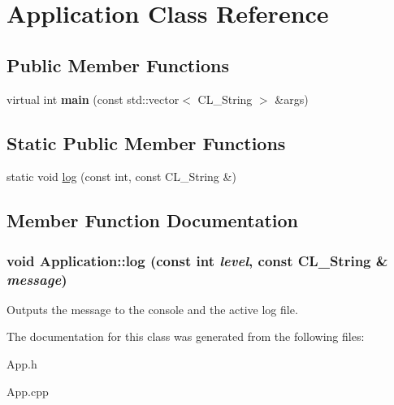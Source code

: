 \hypertarget{classApplication}{
\section{Application Class Reference}
\label{classApplication}
}
\subsection*{Public Member Functions}
\begin{DoxyCompactItemize}
\item 
\hypertarget{classApplication_abbda0eddef2dd5fcce957a82373ecb6c}{
virtual int {\bfseries main} (const std::vector$<$ CL\_\-String $>$ \&args)}
\label{classApplication_abbda0eddef2dd5fcce957a82373ecb6c}

\end{DoxyCompactItemize}
\subsection*{Static Public Member Functions}
\begin{DoxyCompactItemize}
\item 
static void \hyperlink{classApplication_a1112e5aede67cff7aad4c8fb4be3e3af}{log} (const int, const CL\_\-String \&)
\end{DoxyCompactItemize}


\subsection{Member Function Documentation}
\hypertarget{classApplication_a1112e5aede67cff7aad4c8fb4be3e3af}{
\subsubsection[{log}]{\setlength{\rightskip}{0pt plus 5cm}void Application::log (const int {\em level}, \/  const CL\_\-String \& {\em message})}}
\label{classApplication_a1112e5aede67cff7aad4c8fb4be3e3af}
Outputs the message to the console and the active log file. 

The documentation for this class was generated from the following files:\begin{DoxyCompactItemize}
\item 
App.h\item 
App.cpp\end{DoxyCompactItemize}

